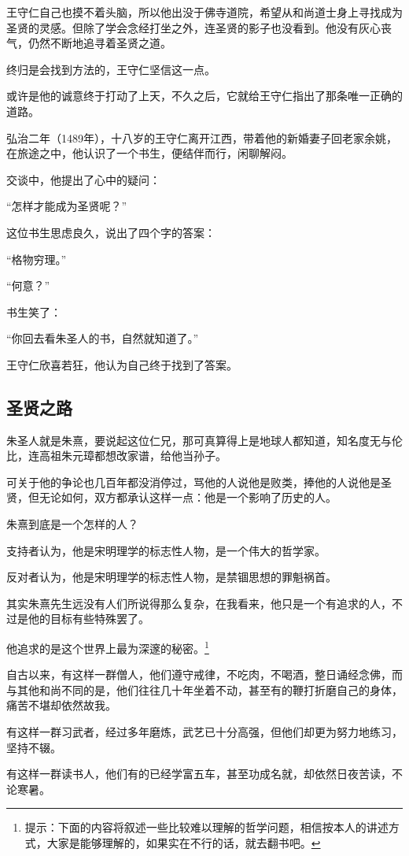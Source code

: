\begin{multicols}{\theparacolNo}
王守仁自己也摸不着头脑，所以他出没于佛寺道院，希望从和尚道士身上寻找成为圣贤的灵感。但除了学会念经打坐之外，连圣贤的影子也没看到。他没有灰心丧气，仍然不断地追寻着圣贤之道。

终归是会找到方法的，王守仁坚信这一点。

或许是他的诚意终于打动了上天，不久之后，它就给王守仁指出了那条唯一正确的道路。

弘治二年（1489年），十八岁的王守仁离开江西，带着他的新婚妻子回老家余姚，在旅途之中，他认识了一个书生，便结伴而行，闲聊解闷。

交谈中，他提出了心中的疑问：

“怎样才能成为圣贤呢？”

这位书生思虑良久，说出了四个字的答案：

“格物穷理。”

“何意？”

书生笑了：

“你回去看朱圣人的书，自然就知道了。”

王守仁欣喜若狂，他认为自己终于找到了答案。

\subsection{圣贤之路}
朱圣人就是朱熹，要说起这位仁兄，那可真算得上是地球人都知道，知名度无与伦比，连高祖朱元璋都想改家谱，给他当孙子。

可关于他的争论也几百年都没消停过，骂他的人说他是败类，捧他的人说他是圣贤，但无论如何，双方都承认这样一点：他是一个影响了历史的人。

朱熹到底是一个怎样的人？

支持者认为，他是宋明理学的标志性人物，是一个伟大的哲学家。

反对者认为，他是宋明理学的标志性人物，是禁锢思想的罪魁祸首。

其实朱熹先生远没有人们所说得那么复杂，在我看来，他只是一个有追求的人，不过是他的目标有些特殊罢了。

他追求的是这个世界上最为深邃的秘密。\footnote{提示：下面的内容将叙述一些比较难以理解的哲学问题，相信按本人的讲述方式，大家是能够理解的，如果实在不行的话，就去翻书吧。}

自古以来，有这样一群僧人，他们遵守戒律，不吃肉，不喝酒，整日诵经念佛，而与其他和尚不同的是，他们往往几十年坐着不动，甚至有的鞭打折磨自己的身体，痛苦不堪却依然故我。

有这样一群习武者，经过多年磨炼，武艺已十分高强，但他们却更为努力地练习，坚持不辍。

有这样一群读书人，他们有的已经学富五车，甚至功成名就，却依然日夜苦读，不论寒暑。


\end{multicols}
